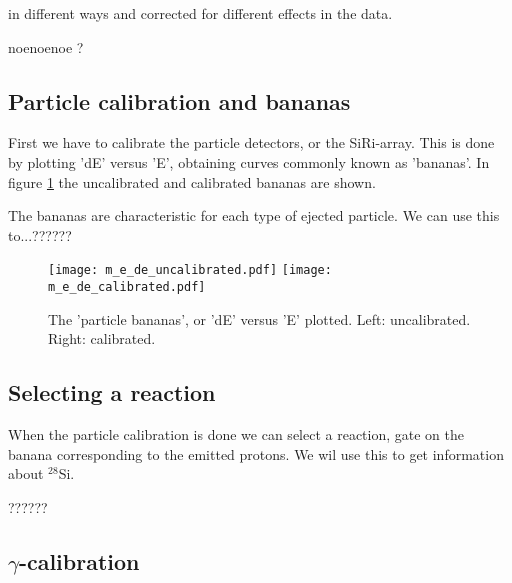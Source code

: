 \documentclass[11pt,a4wide]{article}
\begin{document}
in different ways and corrected for different effects in the data. 

noenoenoe ?

\subsection{Particle calibration and bananas}
First we have to calibrate the particle detectors, or the SiRi-array. This is done by plotting 'dE' versus 'E', obtaining curves commonly known as 'bananas'. In figure \ref{fig: de_e} the uncalibrated and calibrated bananas are shown. 

The bananas are characteristic for each type of ejected particle. We can use this to...??????

\begin{figure}[htp]
\centering
\texttt{[image: m\_e\_de\_uncalibrated.pdf]}
\texttt{[image: m\_e\_de\_calibrated.pdf]} %
\caption{The 'particle bananas', or 'dE' versus 'E' plotted. Left: uncalibrated. Right: calibrated.}
\label{fig: de_e}
\end{figure}

\subsection{Selecting a reaction}
When the particle calibration is done we can select a reaction, gate on the banana corresponding to the emitted protons. We wil use this to get information about ${}^28$Si. 



??????

\subsection{$\gamma$-calibration}
\end{document}
